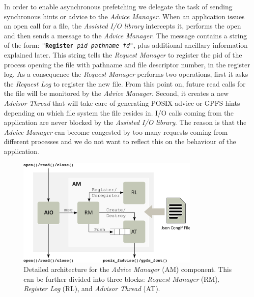 In order to enable asynchronous prefetching we delegate the task of sending synchronous hints or advice to the \textit{Advice Manager}. When an application issues an open call for a file, the \textit{Assisted I/O library} intercepts it, performs the open and then sends a message to the \textit{Advice Manager}. The message contains a string of the form: \texttt{"\textbf{Register} \textit{pid} \textit{pathname} \textit{fd}"}, plus additional ancillary information explained later. This string tells the \textit{Request Manager} to register the pid of the process opening the file with pathname and file descriptor number, in the register log. As a consequence the \textit{Request Manager} performs two operations, first it asks the \textit{Request Log} to register the new file. From this point on, future read calls for the file will be monitored by the \textit{Advice Manager}. Second, it creates a new \textit{Advisor Thread} that will take care of generating POSIX advice or GPFS hints depending on which file system the file resides in. I/O calls coming from the application are never blocked by the \textit{Assisted I/O library}. The reason is that the \textit{Advice Manager} can become congested by too many requests coming from different processes and we do not want to reflect this on the behaviour of the application.  %

\begin{figure}[!htb]
  \centering
  \includegraphics[width=0.8\textwidth]{chapters/chapter2/figures/mercury-architecture}
  \caption{Detailed architecture for the \textit{Advice Manager} (AM) component. This can be further divided into three blocks: \textit{Request Manager} (RM), \textit{Register Log} (RL), and \textit{Advisor Thread} (AT).}
  \label{figure: architecture}
\end{figure}

